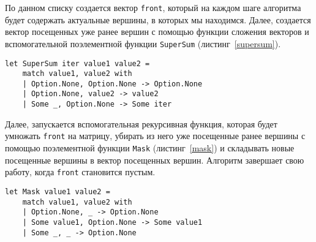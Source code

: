 По данном списку создается вектор \texttt{front}, который на каждом шаге алгоритма будет содержать актуальные вершины, в которых мы находимся. Далее, создается вектор посещенных уже ранее вершин с помощью функции сложения векторов и вспомогательной поэлементной функции \texttt{SuperSum} (листинг~\ref{supersum}). 

\begin{lstlisting}[style=codelistingstyle, caption={Вспомогательная поэлементная функция для определения посещенных вершин},label={supersum}, frame=single]
let SuperSum iter value1 value2 =
    match value1, value2 with
    | Option.None, Option.None -> Option.None
    | Option.None, value2 -> value2
    | Some _, Option.None -> Some iter
\end{lstlisting}

Далее, запускается вспомогательная рекурсивная функция, которая будет умножать \texttt{front} на матрицу, убирать из него уже посещенные ранее вершины с помощью поэлементной функции \texttt{Mask} (листинг~\ref{mask}) и складывать новые посещенные вершины в вектор посещенных вершин. Алгоритм завершает свою работу, когда \texttt{front} становится пустым. 

\begin{lstlisting}[style=codelistingstyle, caption={Вспомогательная поэлементная функция для удаления из ветора front посещенных ранее вершин},label={mask}, frame=single]
let Mask value1 value2 =
    match value1, value2 with
    | Option.None, _ -> Option.None
    | Some value1, Option.None -> Some value1
    | Some _, _ -> Option.None
\end{lstlisting}